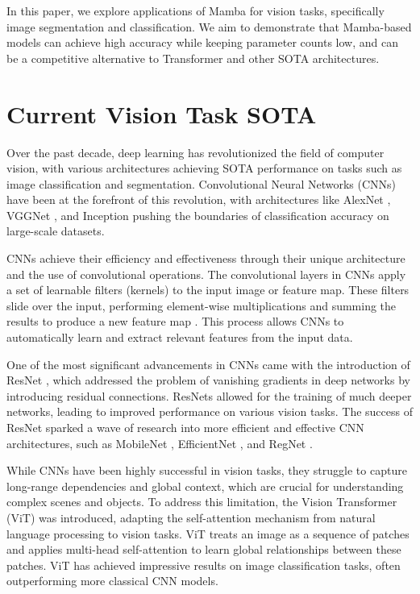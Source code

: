 \documentclass[conference]{IEEEtran}
\begin{document}
In this paper, we explore applications of Mamba for vision tasks, specifically image segmentation and classification. We aim to demonstrate that Mamba-based models can achieve high accuracy while keeping parameter counts low, and can be a competitive alternative to Transformer and other SOTA architectures.


\section{Current Vision Task SOTA}
Over the past decade, deep learning has revolutionized the field of computer vision, with various architectures achieving SOTA performance on tasks such as image classification and segmentation. Convolutional Neural Networks (CNNs)\cite{lecundocument} have been at the forefront of this revolution, with architectures like AlexNet \cite{krizhevsky2012imagenet}, VGGNet \cite{simonyan2014deep}, and Inception \cite{szegedy2015going} pushing the boundaries of classification accuracy on large-scale datasets.

CNNs achieve their efficiency and effectiveness through their unique architecture and the use of convolutional operations. The convolutional layers in CNNs apply a set of learnable filters (kernels) to the input image or feature map. These filters slide over the input, performing element-wise multiplications and summing the results to produce a new feature map \cite{lecundocument}. This process allows CNNs to automatically learn and extract relevant features from the input data.

One of the most significant advancements in CNNs came with the introduction of ResNet \cite{he2015deep}, which addressed the problem of vanishing gradients in deep networks by introducing residual connections. ResNets allowed for the training of much deeper networks, leading to improved performance on various vision tasks. The success of ResNet sparked a wave of research into more efficient and effective CNN architectures, such as MobileNet \cite{howard2017mobilenets}, EfficientNet \cite{tan2020efficientnet}, and RegNet \cite{radosavovic2020designing}.

While CNNs have been highly successful in vision tasks, they struggle to capture long-range dependencies and global context, which are crucial for understanding complex scenes and objects. To address this limitation, the Vision Transformer (ViT) \cite{dosovitskiy2021image} was introduced, adapting the self-attention mechanism from natural language processing to vision tasks. ViT treats an image as a sequence of patches and applies multi-head self-attention to learn global relationships between these patches. ViT has achieved impressive results on image classification tasks, often outperforming more classical CNN models.
\end{document}
